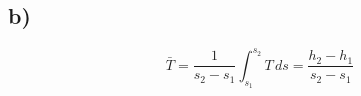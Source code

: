

\subsection*{b)}
\[
\bar{T} = \frac{1}{s_2 - s_1} \int_{s_1}^{s_2} T \, ds = \frac{h_2 - h_1}{s_2 - s_1}
\]